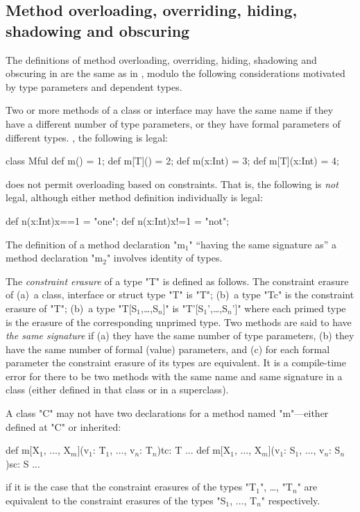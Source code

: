 \subsection{Method overloading, overriding, hiding, shadowing and obscuring}
\label{MethodOverload}


The definitions of method overloading, overriding, hiding, shadowing
and obscuring in \Xten{} are the same as in \Java, modulo the following
considerations motivated by type parameters and dependent types.

Two or more methods of a class or interface may have the same
name if they have a different number of type parameters, or
they have formal parameters of different types.  \Eg, the following is legal: 

%
\begin{xten}
class Mful{
   def m() = 1;
   def m[T]() = 2;
   def m(x:Int) = 3;
   def m[T](x:Int) = 4;
}
\end{xten}
%

\XtenCurrVer{} does not permit overloading based on constraints. That is, the
following is {\em not} legal, although either method definition individually
is legal:
\begin{xten}
   def n(x:Int){x==1} = "one";
   def n(x:Int){x!=1} = "not";
\end{xten}


The definition of a method declaration \xcdmath"m$_1$" ``having the same signature
as'' a method declaration \xcdmath"m$_2$" involves identity of types. 

The {\em constraint erasure} of a type \xcdmath"T" is defined as follows.
The constraint erasure of  (a)~a class, interface or struct type \xcdmath"T" is 
\xcdmath"T"; (b)~a type \xcdmath"T{c}" is the constraint erasure of 
\xcdmath"T"; (b)~a type \xcdmath"T[S$_1$,\ldots,S$_n$]" 
is \xcdmath"T'[S$_1$',\ldots,S$_n$']" where each primed type is the erasure of 
the corresponding unprimed type.
 Two methods are said to have {\em the
  same signature} if (a) they have the same number of type parameters,
(b) they have the same number of formal (value) parameters, and (c)
for each formal parameter the constraint erasure of its types are equivalent. It is a
compile-time error for there to be two methods with the same name and
same signature in a class (either defined in that class or in a
superclass).

\begin{staticrule*}
  A class \xcd"C" may not have two declarations for a method named \xcd"m"---either
  defined at \xcd"C" or inherited:
\begin{xtenmath}
def m[X$_1$, $\dots$, X$_m$](v$_1$: T$_1$, $\dots$, v$_n$: T$_n$){tc}: T {...}
def m[X$_1$, $\dots$, X$_m$](v$_1$: S$_1$, $\dots$, v$_n$: S$_n$){sc}: S {...}
\end{xtenmath}
\noindent
if it is the case that the constraint erasures of the types \xcdmath"T$_1$",
\dots, \xcdmath"T$_n$" are
equivalent to the constraint erasures of the types \xcdmath"S$_1$, $\dots$, T$_n$"
respectively.
\end{staticrule*}

